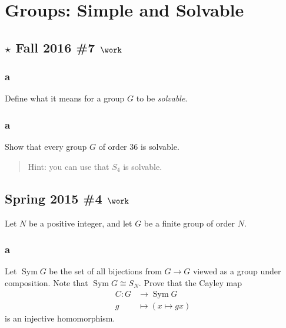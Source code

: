 \hypertarget{groups-simple-and-solvable}{%
\section{Groups: Simple and Solvable}\label{groups-simple-and-solvable}}

\hypertarget{star-fall-2016-7-work}{%
\subsection{\texorpdfstring{\(\star\) Fall 2016 \#7
\(\work\)}{\textbackslash star Fall 2016 \#7 \textbackslash work}}\label{star-fall-2016-7-work}}

\hypertarget{a-25}{%
\subsubsection{a}\label{a-25}}

Define what it means for a group \(G\) to be \emph{solvable}.

\hypertarget{a-26}{%
\subsubsection{a}\label{a-26}}

Show that every group \(G\) of order 36 is solvable.

\begin{quote}
Hint: you can use that \(S_4\) is solvable.
\end{quote}

\hypertarget{spring-2015-4-work}{%
\subsection{\texorpdfstring{Spring 2015 \#4
\(\work\)}{Spring 2015 \#4 \textbackslash work}}\label{spring-2015-4-work}}

Let \(N\) be a positive integer, and let \(G\) be a finite group of
order \(N\).

\hypertarget{a-27}{%
\subsubsection{a}\label{a-27}}

Let \(\operatorname{Sym}G\) be the set of all bijections from \(G\to G\)
viewed as a group under composition. Note that
\(\operatorname{Sym}G \cong S_N\). Prove that the Cayley map
\begin{align*}
C: G&\to \operatorname{Sym}G\\
g &\mapsto (x\mapsto gx)
\end{align*}
is an injective homomorphism.

